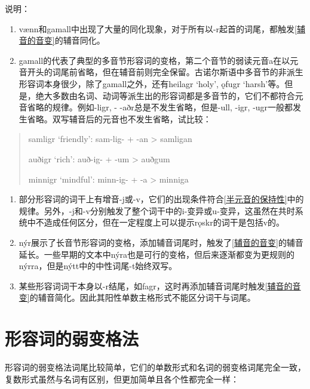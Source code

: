 说明：

\begin{enumerate}
  \def\labelenumi{\arabic{enumi})}
  \item
        vænn和gamall中出现了大量的同化现象，对于所有以-r起首的词尾，都触发\ref{辅音的音变}的辅音同化。
  \item
        gamall的代表了典型的多音节形容词的变格，第二个音节的弱读元音a在以元音开头的词尾前省略，但在辅音前则完全保留。古诺尔斯语中多音节的非派生形容词本身很少，除了gamall之外，还有heilagr
        `holy', ǫfugr
        `harsh'等。但是，绝大多数由名词、动词等派生出的形容词都是多音节的，它们不都符合元音省略的规律。例如-ligr,
        - -aðr总是不发生省略，但是-ull, -igr,
        -ugr一般都发生省略。双写辅音后的元音也不发生省略，试比较：
\end{enumerate}

\begin{quote}
  samligr `friendly': sam-lig- + -an \textgreater{} samligan

  auðigr `rich': auð-ig- + -um \textgreater{} auðgum

  minnigr `mindful': minn-ig- + -a \textgreater{} minniga
\end{quote}

\begin{enumerate}
  \def\labelenumi{\arabic{enumi})}
  \setcounter{enumi}{2}
  \item
        部分形容词的词干上有增音-j或-v，它们的出现条件符合\ref{半元音的保持性}中的规律。另外，-j和-v分别触发了整个词干中的i-变异或u-变异，这虽然在共时系统中不造成任何区分，但在一定程度上可以提示rǫskr的词干是包括v的。
  \item
        nýr展示了长音节形容词的变格，添加辅音词尾时，触发了\ref{辅音的音变}的辅音延长。一些早期的文本中nýra也是可行的变格，但后来逐渐都变为更规则的nýrra，但是nýtt中的中性词尾-t始终双写。
  \item
        某些形容词词干本身以-r结尾，如fagr，这时再添加辅音词尾时触发\ref{辅音的音变}的辅音简化。因此其阳性单数主格形式不能区分词干与词尾。
\end{enumerate}

\section{形容词的弱变格法}\label{形容词的弱变格法}

形容词的弱变格法词尾比较简单，它们的单数形式和名词的弱变格词尾完全一致，复数形式虽然与名词有区别，但更加简单且各个性都完全一样：

